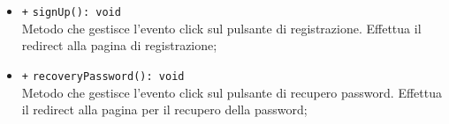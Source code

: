 \begin{itemize}
\begin{itemize}
		\item \texttt{+} \texttt{signUp(): void} \\
		Metodo che gestisce l’evento click sul pulsante di registrazione. Effettua il redirect alla pagina di registrazione;
		\item \texttt{+} \texttt{recoveryPassword(): void} \\
		Metodo che gestisce l’evento click sul pulsante di recupero password. Effettua il redirect alla pagina per il recupero della password; 
	\end{itemize}
\end{itemize}

